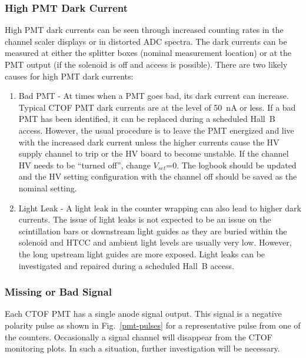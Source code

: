 \documentclass[12pt]{article}
\begin{document}
\subsubsection{High PMT Dark Current}
\label{high-current}

High PMT dark currents can be seen through increased counting rates in the channel scaler displays or in
distorted ADC spectra. The dark currents can be measured at either the splitter boxes (nominal measurement
location) or at the PMT output (if the solenoid is off and access is possible). There are two likely causes for
high PMT dark currents:

\begin{enumerate}
\item Bad PMT - At times when a PMT goes bad, its dark current can increase. Typical CTOF PMT dark currents
are at the level of 50~nA or less. If a bad PMT has been identified, it can be replaced during a scheduled
Hall~B access. However, the usual procedure is to leave the PMT energized and live with the increased dark
current unless the higher currents cause the HV supply channel to trip or the HV board to become unstable. If
the channel HV needs to be ``turned off'', change $V_{set}$=0. The logbook should be updated and the HV
setting configuration with the channel off should be saved as the nominal setting.
\item Light Leak - A light leak in the counter wrapping can also lead to higher dark currents. The issue of light
leaks is not expected to be an issue on the scintillation bars or downstream light guides as they are buried within
the solenoid and HTCC and ambient light levels are usually very low. However, the long upstream light guides are
more exposed. Light leaks can be investigated and repaired during a scheduled Hall~B access.
\end{enumerate}

\subsubsection{Missing or Bad Signal}
\label{missing}

Each CTOF PMT has a single anode signal output. This signal is a negative polarity pulse as shown in
Fig.~\ref{pmt-pulses} for a representative pulse from one of the counters. Occasionally a signal channel will
disappear from the CTOF monitoring plots. In such a situation, further investigation will be necessary. 
\end{document}
